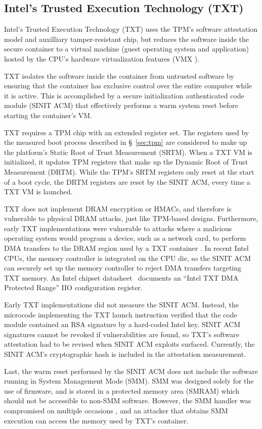 \subsection{Intel's Trusted Execution Technology (TXT)}
\label{sec:intel_txt}

Intel's Trusted Execution Technology (TXT) \cite{grawrock2009txt} uses the
TPM's software attestation model and auxilliary tamper-resistant chip, but
reduces the software inside the secure container to a virtual machine (guest
operating system and application) hosted by the CPU's hardware virtualization
features (VMX \cite{uhlig2005vmx}).

TXT isolates the software inside the container from untrusted software by
ensuring that the container has exclusive control over the entire computer
while it is active. This is accomplished by a secure initialization
authenticated code module (SINIT ACM) that effectively performs a warm system
reset before starting the container's VM.

TXT requires a TPM chip with an extended register set. The registers used by
the measured boot process described in \S~\ref{sec:tpm} are considered to make
up the platform's Static Root of Trust Measurement (SRTM). When a TXT VM is
initialized, it updates TPM registers that make up the Dynamic Root of Trust
Measurement (DRTM). While the TPM's SRTM registers only reset at the start of a
boot cycle, the DRTM registers are reset by the SINIT ACM, every time a TXT VM
is launched.

TXT does not implement DRAM encryption or HMACs, and therefore is vulnerable to
physical DRAM attacks, just like TPM-based designs. Furthermore, early TXT
implementations were vulnerable to attacks where a malicious operating system
would program a device, such as a network card, to perform DMA transfers
to the DRAM region used by a TXT container \cite{wojtczuk2009txt,
wojtczuk2009txt2}. In recent Intel CPUs, the memory controller is integrated on
the CPU die, so the SINIT ACM can securely set up the memory controller to
reject DMA transfers targeting TXT memory. An Intel chipset
datasheet~\cite{intel2015datasheet} documents an ``Intel TXT DMA Protected
Range'' IIO configuration register.

Early TXT implementations did not measure the SINIT ACM. Instead, the microcode
implementing the TXT launch instruction verified that the code module contained
an RSA signature by a hard-coded Intel key. SINIT ACM signatures cannot be
revoked if vulnerabilities are found, so TXT's software attestation had to be
revised when SINIT ACM exploits \cite{wojtczuk2011txt} surfaced. Currently, the
SINIT ACM's cryptographic hash is included in the attestation measurement.

Last, the warm reset performed by the SINIT ACM does not include the software
running in System Management Mode (SMM). SMM was designed
solely for the use of firmware, and is stored in a protected memory area
(SMRAM) which should not be accessible to non-SMM software. However, the SMM
handler was compromised on multiple occasions \cite{duflot2006smm,
rutkowska2008remap, wojtczuk2009smm, wecherowski2009smm, embleton2010smm}, and
an attacker that obtains SMM execution can access the memory used by TXT's
container.
